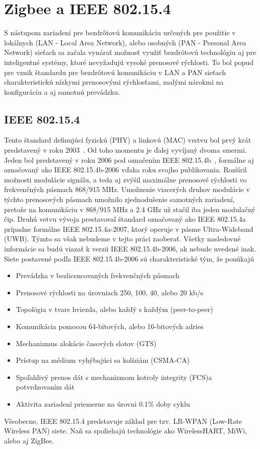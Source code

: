 \chapter{Zigbee a IEEE 802.15.4}

\indent\indent S nástupom zariadení pre bezdrôtovú komunikáciu určených pre použitie v lokálnych (LAN - Local Area Network), alebo osobných (PAN - Personal Area Network) sieťach sa začala vynárať možnosť využiť bezdrôtovú technológiu aj pre inteligentné systémy, ktoré nevyžadujú vysoké prenosové rýchlosti. To bol popud pre vznik štandardu pre bezdrôtovú komunikáciu v LAN a PAN sieťach charakteristickú nízkymi prenosovými rýchlosťami, malými nárokmi na konfiguráciu a aj samotnú prevádzku.

\section{IEEE 802.15.4}

\indent\indent Tento štandard definujúci fyzickú (PHY) a linkovú (MAC) vrstvu bol prvý krát predstavený v roku 2003~\cite{ieee03}. Od toho momentu je ďalej vyvíjaný dvoma smermi. Jeden bol predstavený v roku 2006 pod označením IEEE 802.15.4b~\cite{ieee06}, formálne aj označovaný ako IEEE 802.15.4b-2006 vďaka roku svojho publikovania. Rozšíril možnosti modulácie signálu, a teda aj zvýšil maximálne prenosové rýchlosti vo frekvenčných pásmach 868/915 MHz. Umožnenie viacerých druhov modulácie v týchto prenosových pásmach umožnilo zjednodušenie samotných zariadení, pretože na komunikáciu v 868/915 MHz a 2.4 GHz už stačil iba jeden modulačný čip. Druhú vetvu vývoja prestavoval štandard označovaný ako IEEE 802.15.4a prípadne formálne IEEE 802.15.4a-2007, ktorý operuje v pásme Ultra-Wideband (UWB). Týmto sa však nebudeme v tejto práci zaoberať. Všetky nasledovné informácie sa budú viazať k verzii IEEE 802.15.4b-2006, ak nebude uvedené inak.\\
\indent Siete postavené podľa IEEE 802.15.4b-2006 sú charakteristické tým, že ponúkajú
\begin{itemize}
\item Prevádzka v bezlicencovaných frekvenčných pásmach
\item Prenosové rýchlosti na úrovniach 250, 100, 40, alebo 20 kb/s
\item Topológia v tvare hviezda, alebo každý s každým (peer-to-peer)
\item Komunikácia pomocou 64-bitových, alebo 16-bitových adries
\item Mechanizmus alokácie časových slotov (GTS)
\item Prístup na médium vyhýbajúci sa kolíziám (CSMA-CA)
\item Spoľahlivý prenos dát s mechanizmom kotroly integrity (FCS)a potvrdzovaním dát
\item Aktivita zariadení priemerne na úrovni 0.1\% doby cyklu
\end{itemize}
\indent Všeobecne, IEEE 802.15.4 predstavuje základ pre tzv. LR-WPAN (Low-Rate Wireless PAN) siete. Naň sa spoliehajú technológie ako WirelessHART, MiWi, alebo aj ZigBee.

